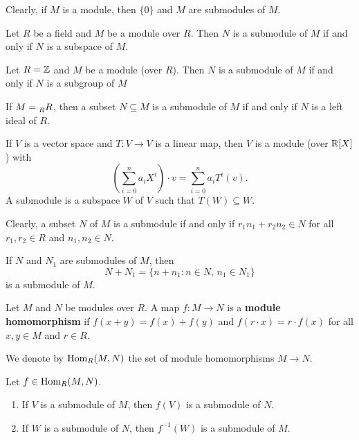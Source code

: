 Clearly, if $M$ is a module, then $\{0\}$ and $M$ are submodules of $M$. 

\begin{example}
Let $R$ be a field and $M$ be a module over $R$. Then
$N$ is a submodule of $M$ if and only if $N$ is a subspace of $M$. 
\end{example}

\begin{example}
Let $R=\mathbb{Z}$ and $M$ be a module (over $R$). Then
$N$ is a submodule of $M$ if and only if $N$ is a subgroup of $M$
\end{example}

\begin{example}
If $M=\prescript{}{R}R$, then a subset $N\subseteq M$ is a submodule
of $M$ if and only if $N$ is a left ideal of $R$. 
\end{example}

\begin{example}
If $V$ is a vector space and $T\colon V\to V$ is a linear map, then
$V$ is a module (over $\mathbb{R}[X]$) with  
\[
\left(\sum_{i=0}^na_iX^i\right)\cdot v=\sum_{i=0}^na_iT^i(v).
\]
A submodule is a subspace $W$ 
of $V$ such that $T(W)\subseteq W$. 
\end{example}

Clearly, a subset $N$ of $M$ is a submodule if and only 
if $r_1n_1+r_2n_2\in N$ for all
$r_1,r_2\in R$ and $n_1,n_2\in N$. 	

\begin{exercise}
If $N$ and $N_1$ are submodules of $M$, then 
\[
N+N_1=\{n+n_1:n\in N,\,n_1\in N_1\}
\]
is a submodule of $M$.
\end{exercise}

\begin{definition}
Let $M$ and $N$ be modules over $R$. 
A map $f\colon M\to N$ is a \textbf{module homomorphism} if $f(x+y)=f(x)+f(y)$ and 
$f(r\cdot x)=r\cdot f(x)$ for all $x,y\in M$ and $r\in R$. 
\end{definition}

We denote by $\operatorname{Hom}_R(M,N)$ the set of module homomorphisms $M\to N$. 

\begin{exercise}
Let $f\in\operatorname{Hom}_R(M,N)$.  
\begin{enumerate}
\item If $V$ is a submodule of $M$, then $f(V)$ is a submodule of $N$.
\item If $W$ is a submodule of $N$, then $f^{-1}(W)$ is a submodule of $M$.
\end{enumerate}
\end{exercise}

